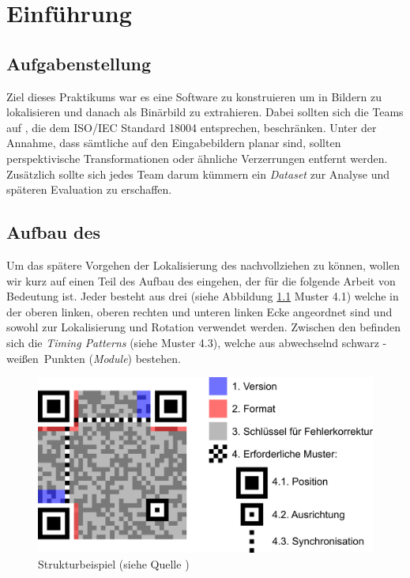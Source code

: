 \chapter{Einführung}
\section{Aufgabenstellung}
Ziel dieses Praktikums war es eine Software zu konstruieren um \QRCodes in Bildern zu lokalisieren und danach als Binärbild zu extrahieren.
Dabei sollten sich die Teams auf \QRCodes, die dem ISO/IEC Standard 18004 entsprechen, beschränken.
Unter der Annahme, dass sämtliche \QRCodes auf den Eingabebildern planar sind, sollten perspektivische Transformationen oder ähnliche Verzerrungen entfernt werden.
Zusätzlich sollte sich jedes Team darum kümmern ein \emph{Dataset} zur Analyse und späteren Evaluation zu erschaffen.
 
\section{Aufbau des \QRCodes}
Um das spätere Vorgehen der Lokalisierung des \QRCodes nachvollziehen zu können, wollen wir kurz auf einen Teil des Aufbau des \QRCodes eingehen, der für die folgende Arbeit von Bedeutung ist.
Jeder \QRCode besteht aus drei \emph{\fps} (siehe Abbildung \ref{fig:strukturqrcode} Muster 4.1) welche in der oberen linken, oberen rechten und unteren linken Ecke angeordnet sind und sowohl zur Lokalisierung und Rotation verwendet werden. Zwischen den \fps befinden sich die \emph{Timing Patterns} (siehe Muster 4.3), welche aus abwechselnd \glqq schwarz - weißen\grqq\ Punkten (\emph{Module}) bestehen.

\begin{figure}[h]
\centering
\includegraphics[scale=0.27]{images/QR_Code_Struktur_Beispiel.png}
\caption{\QRCode Strukturbeispiel (siehe Quelle \cite{qrcoderef})}
\label{fig:strukturqrcode}
\end{figure}

